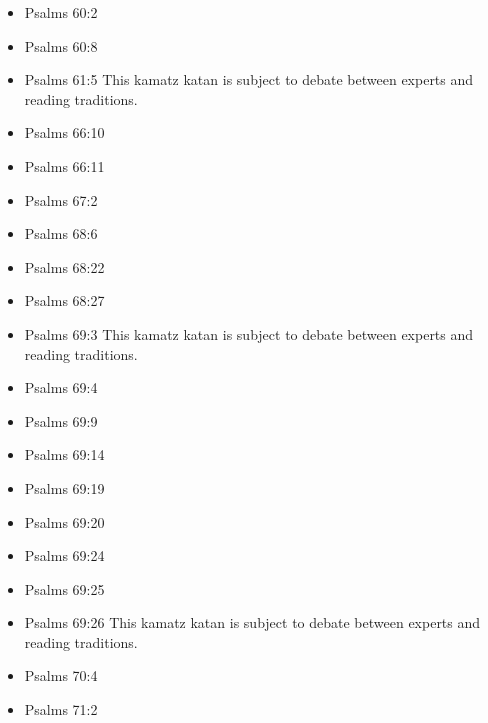 \documentclass[14pt]{book}
\begin{document}
\begin{multicols}{2}
\begin{itemize}
\item Psalms 60:2

\item Psalms 60:8

\item Psalms 61:5 This kamatz katan is subject to debate between experts and reading traditions.

\item Psalms 66:10

\item Psalms 66:11

\item Psalms 67:2

\item Psalms 68:6

\item Psalms 68:22

\item Psalms 68:27

\item Psalms 69:3 This kamatz katan is subject to debate between experts and reading traditions.

\item Psalms 69:4
	
	\item Psalms 69:9
	
	\item Psalms 69:14
	
	\item Psalms 69:19
	
	\item Psalms 69:20
	
	\item Psalms 69:24
	
	\item Psalms 69:25
	
	\item Psalms 69:26 This kamatz katan is subject to debate between experts and reading traditions.
	
	\item Psalms 70:4
	
	
	\item Psalms 71:2
	

\end{itemize}
\end{multicols}
\end{document}
